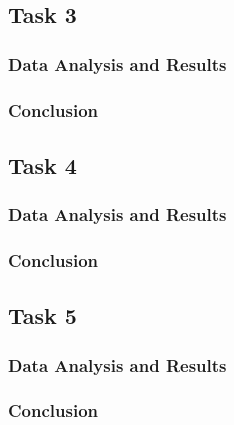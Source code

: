 \documentclass[a4paper]{article}
\begin{document}
\subsection{Task 3}

\subsubsection{Data Analysis and Results}

\subsubsection{Conclusion}

\subsection{Task 4}

\subsubsection{Data Analysis and Results}

\subsubsection{Conclusion}

\subsection{Task 5}

\subsubsection{Data Analysis and Results}

\subsubsection{Conclusion}
\end{document}
